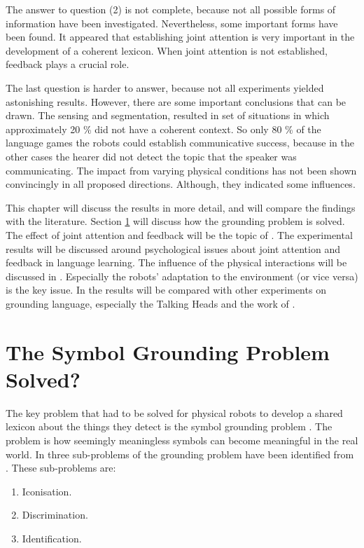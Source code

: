 The answer to question (2) is not complete, because not all possible forms of information have been investigated. Nevertheless, some important forms have been found. It appeared that establishing joint attention is very important in the development of a coherent lexicon. When joint attention is not established, feedback plays a crucial role.

The last question is harder to answer, because not all experiments yielded astonishing results. However, there are some important conclusions that can be drawn. The sensing and segmentation, resulted in set of situations in which approximately 20 \% did not have a coherent context. So only 80 \% of the language games the robots could establish communicative success, because in the other cases the hearer did not detect the topic that the speaker was communicating. The impact from varying physical conditions has not been shown convincingly in all proposed directions. Although, they indicated some influences.


This chapter will discuss the results in more detail, and will compare the findings with the literature. Section \ref{s:disc:global} will discuss how the grounding problem is solved. The effect of joint attention and feedback will be the topic of . The experimental results will be discussed around psychological issues about joint attention and feedback in language learning. The influence of the physical interactions will be discussed in . Especially the robots' adaptation to the environment (or vice versa) is the key issue. In  the results will be compared with other experiments on grounding language, especially the Talking Heads \citep{belpaeme:1998} and the work of \citet{billard:1997a}.

\section{The Symbol Grounding Problem Solved?}\label{s:disc:global}

The key problem that had to be solved for physical robots to develop a shared lexicon about the things they detect is the symbol grounding problem \citep{harnad:1990}. The problem is how seemingly meaningless symbols can become meaningful in the real world. In  three sub-problems of the grounding problem have been identified from \citep{harnad:1990}. These sub-problems are:

\begin{enumerate}
\item Iconisation.
\item Discrimination.
\item Identification.
\end{enumerate}

